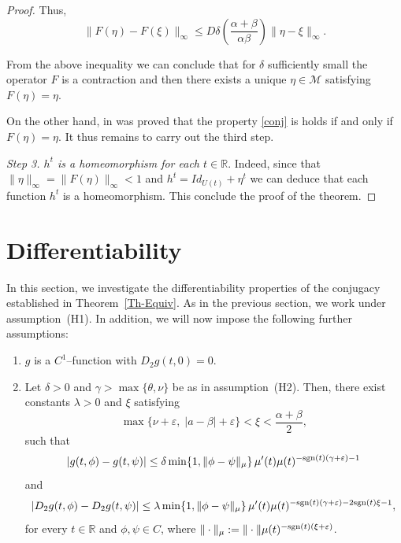 \documentclass[9pt]{amsart}
\numberwithin{equation}{section}
\numberwithin{lemma}{section}
\begin{document}
\begin{proof}
Thus,
\begin{equation*}
    \|F(\eta)-F(\xi)\|_{\infty}\leq D\delta\left(\frac{\alpha+\beta}{\alpha\beta}\right)\|\eta-\xi\|_{\infty}.
\end{equation*}

From the above inequality we can conclude that for $\delta$ sufficiently small the operator $F$ is a contraction and then there exists a unique $\eta\in\mathcal{M}$ satisfying $F(\eta)=\eta$.

On the other hand, in \cite[Lemma 2]{B-v-per} was proved that the property \eqref{conj} is holds if and only if $F(\eta)=\eta.$  
It thus remains to carry out the third step.


\textit{Step 3. $h^t$ is a homeomorphism for each $t \in \mathbb{R}.$} Indeed, since that $\|\eta\|_{\infty}=\|F(\eta)\|_{\infty}<1$  and $h^t=Id_{U(t)}+\eta^{t}$ we can deduce that each function $h^t$ is a homeomorphism. This conclude the proof of the theorem.

\end{proof}







 
\section{Differentiability}

In this section, we investigate the differentiability properties of the conjugacy established in Theorem~\ref{Th-Equiv}. As in the previous section, we work under assumption~(H1). In addition, we will now impose the following further assumptions:


\begin{enumerate}
    \item[(H3)] $g$ is a $C^1$--function with $D_2g(t,0)=0$.
    \item[(H4)] Let \(\delta > 0\) and \(\gamma > \max\{\theta, \nu\}\) be as in assumption~\textnormal{(H2)}. Then, there exist constants \(\lambda > 0\) and \(\xi\) satisfying
\[
\max\{\nu + \varepsilon,\; |a - \beta| + \varepsilon\} < \xi < \dfrac{\alpha + \beta}{2},
\]
such that
\begin{equation}\label{g-cond2}
    |g(t,\phi) - g(t,\psi)| \leq \delta \min\{1,\|\phi - \psi\|_{\mu}\} \, \mu'(t)\mu(t)^{-\textnormal{sgn}(t)(\gamma + \varepsilon) - 1}
\end{equation}
and
\begin{equation}\label{Dg-cond}
    |D_2g(t,\phi) - D_2g(t,\psi)| \leq \lambda \min\{1,\|\phi - \psi\|_{\mu}\} \, \mu'(t)\mu(t)^{-\textnormal{sgn}(t)(\gamma + \varepsilon) - 2\textnormal{sgn}(t)\xi - 1},
\end{equation}
for every \(t \in \mathbb{R}\) and \(\phi, \psi \in C\), where \(\|\cdot\|_{\mu} := \|\cdot\|\mu(t)^{-\textnormal{sgn}(t)(\xi + \varepsilon)}\).

\end{enumerate}
\end{document}
